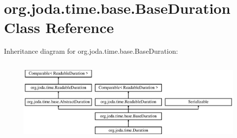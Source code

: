 \hypertarget{classorg_1_1joda_1_1time_1_1base_1_1_base_duration}{\section{org.\-joda.\-time.\-base.\-Base\-Duration Class Reference}
\label{classorg_1_1joda_1_1time_1_1base_1_1_base_duration}
}
Inheritance diagram for org.\-joda.\-time.\-base.\-Base\-Duration\-:\begin{figure}[H]
\begin{center}
\leavevmode
\includegraphics[height=4.185351cm]{classorg_1_1joda_1_1time_1_1base_1_1_base_duration}
\end{center}
\end{figure}
